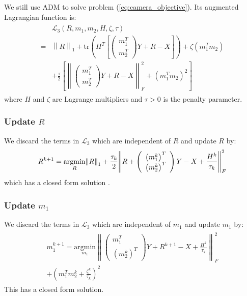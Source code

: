 \documentclass[10pt,twocolumn,letterpaper]{article}
\begin{document}
We still use ADM to solve problem (\ref{eq:camera_objective}). Its
augmented Lagrangian function is:
\begin{eqnarray*}
\begin{array}{rl}
&\mathcal{L}_{3}(R,m_1,m_2,H,\zeta,\tau)\\
=&\left\| R \right\|_1 + \mbox{tr}\left(H^T \left[ \left(
\begin{array}{c}m_1^T \\ m_2^T
\end{array}\right) Y+R-X \right]\right)+ \zeta (m_1^T m_2) \\
&+ \frac{\tau}{2}{ \left[ \left\| \left( \begin{array}{c}m_1^T \\
m_2^T \end{array} \right) Y+R-X \right\|_F^2 +
\left(m_1^Tm_2\right)^2 \right]}
\end{array}\label{eq:lagrange3}
\end{eqnarray*}
where $H$ and $\zeta$ are Lagrange multipliers and $\tau>0$ is the
penalty parameter.

\subsubsection{Update $R$}
We discard the terms in $\mathcal{L}_{3}$ which are independent of
$R$ and update $R$ by:
\begin{equation}
R^{k+1} = \underset{R}{\text{argmin}}{\left\| R
\right\|_1+\frac{\tau_k}{2}{ \left\| R +  \left(
\begin{array}{c} \left(m_1^k\right)^T \\ \left(m_2^k \right)^T
\end{array} \right)Y - X +
\frac{H^k}{\tau_k}\right\|_F^2}} \\ \nonumber \label{eq:updateE}
\end{equation}
which has a closed form solution \cite{liu2013linearized}.
\subsubsection{Update $m_1$}
We discard the terms in $\mathcal{L}_{3}$ which are independent of
$m_1$ and update $m_1$ by:
\begin{eqnarray}
\begin{array}{c}
m_1^{k+1} = \underset{m_1}{\text{argmin}}{\left\| \left(
\begin{array}{c} m_1^T \\ \left( m_2^k \right)^T \end{array}
\right) Y + R^{k+1} - X + \frac{H^k}{\tau_k} \right\|_F^2} \\
\nonumber  { + \left( m_1^Tm_2^k+\frac{\zeta^k}{\tau_k}\right)^2 }
\end{array}
\label{eq:updatem1}
\end{eqnarray}
This has a closed form solution.
\end{document}
